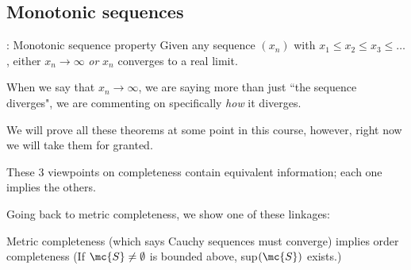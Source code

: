 \subsection{Monotonic sequences}
\begin{ntheorem}{: Monotonic sequence property}
	Given any sequence \((x_n)\) with \(x_1\leq x_2\leq x_3\leq\dots\), either \(x_n\to\infty\) \emph{or} \(x_n\) converges to a real limit.
\end{ntheorem}
\begin{note}
	When we say that \(x_n\to\infty\), we are saying more than just ``the sequence diverges", we are commenting on specifically \emph{how} it diverges.
\end{note}
\begin{note}
	We will prove all these theorems at some point in this course, however, right now we will take them for granted.
\end{note}
\begin{note}[Linkages]
	These 3 viewpoints on completeness contain equivalent information; each one implies the others.
\end{note}
Going back to metric completeness, we show one of these linkages:
\begin{ntheorem}{}
	Metric completeness (which says Cauchy sequences must converge) implies order completeness (If \(\mc{S}\neq\emptyset\) is bounded above, sup\((\mc{S})\) exists.)
\end{ntheorem}
